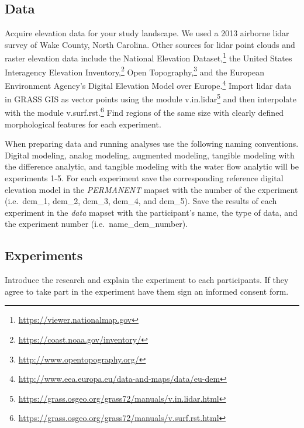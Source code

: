 \documentclass[prodmode,acmtochi]{acmsmall} %
\begin{document}
\subsection{Data}\label{appendix:data}
Acquire elevation data for your study landscape.
We used a 2013 airborne lidar survey of Wake County, North Carolina. 
Other sources for lidar point clouds and raster elevation data 
include the National Elevation Dataset,\footnote{
\url{https://viewer.nationalmap.gov}}
the United States Interagency Elevation Inventory,\footnote{
\url{https://coast.noaa.gov/inventory/}}
Open Topography,\footnote{
\url{http://www.opentopography.org/}}
and the European Environment Agency's
Digital Elevation Model over Europe.\footnote{
\url{http://www.eea.europa.eu/data-and-maps/data/eu-dem}}
%
Import lidar data in GRASS GIS as vector points using the module v.in.lidar\footnote{
\url{https://grass.osgeo.org/grass72/manuals/v.in.lidar.html}}
and then interpolate with the module v.surf.rst.\footnote{
\url{https://grass.osgeo.org/grass72/manuals/v.surf.rst.html}}
%
Find regions of the same size with clearly defined morphological features 
for each experiment. 

When preparing data and running analyses use the following naming conventions.
%
Digital modeling,
analog modeling,
augmented modeling,
tangible modeling with the difference analytic,
and tangible modeling with the water flow analytic
will be experiments 1-5.
%
For each experiment 
save the corresponding reference digital elevation model
in the \emph{PERMANENT} mapset 
with the number of the experiment 
(i.e.~dem{\_}1, 
dem{\_}2, 
dem{\_}3, 
dem{\_}4, 
and dem{\_}5).
%
Save the results of each experiment in the \emph{data} mapset
with the participant's name, the type of data, and the experiment number
(i.e.~name{\_}dem{\_}number).

\subsection{Experiments}\label{appendix:experiments}
Introduce the research and explain the experiment to each participants. 
If they agree to take part in the experiment have them sign an informed consent form.
%
\end{document}
